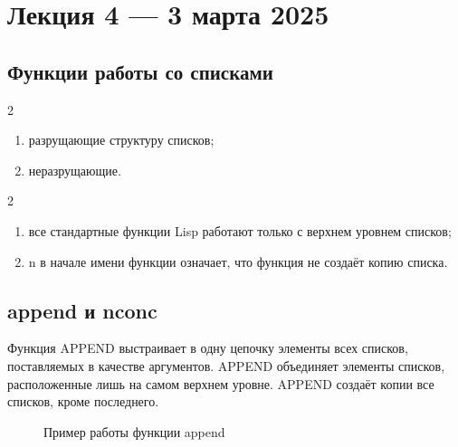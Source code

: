 \chapter{Лекция 4 — 3 марта 2025}

\section{Функции работы со списками}

\begin{listbox}{\noindent \begin{listboxtitle}{}2\end{listboxtitle} 
	}
\begin{enumerate}
	\item разрущающие структуру списков;
	\item неразрущающие.
\end{enumerate}
\end{listbox}

\begin{listbox}{\noindent \begin{listboxtitle}{}2\end{listboxtitle} 
	}
\begin{enumerate}
	\item все стандартные функции Lisp работают только
    с верхнем уровнем списков;
	\item n в начале имени функции означает, что функция
    не создаёт копию списка.
\end{enumerate}
\end{listbox}


\section{append и nconc}

Функция APPEND выстраивает в одну цепочку элементы всех списков, 
поставляемых в качестве аргументов. APPEND объединяет элементы 
списков, расположенные лишь на самом верхнем уровне. APPEND 
создаёт копии все списков, кроме последнего.

\begin{figure}[H]
    \begin{listingbox}{}
        
    \end{listingbox}
    \caption{Пример работы функции append}
    \label{lst:append-example}
\end{figure}

